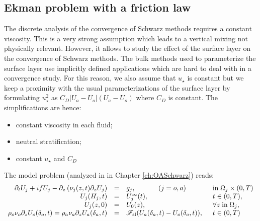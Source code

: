 \subsection{Ekman problem with a friction law}
\label{sec:airseaSCM_hierarchy_Ekman}
The discrete analysis of the convergence of Schwarz methods
requires a constant viscosity. This is a very strong assumption
which leads to a vertical mixing not physically relevant.
However, it allows to study the effect of the surface layer on the
convergence of Schwarz methods.
The bulk methods used to parameterize the surface layer use
implicitly defined applications which are hard to deal with
in a convergence study. For this reason, we also assume
that $u_\star$ is constant but we keep a proximity with
the usual parameterizations of the surface layer
by formulating $u_\star^2$
as $C_D |U_a - U_o|(U_a-U_o)$ where $C_D$ is constant.
The simplifications are hence:
\begin{itemize}
	\item constant viscosity in each fluid;
	\item neutral stratification;
	\item constant $u_\star$ and $C_D$
\end{itemize}
The model problem (analyzed in in Chapter \ref{ch:OASchwarz}) reads:
\begin{equation}
\label{eq:cplProblem}
\begin{array}{rcll}
\partial_t U_j + i f U_j - \partial_z \left( \nu_j(z,t) \partial_z U_j \right) &=& g_j,
~~~~~~~~~~ (j=o,a)
& \mbox{in}\;\Omega_j \times (0,T)\\
U_j(H_j,t) &=& U_j^\infty(t),  & t \in (0,T), \\ 
U_j(z,0) &=& U_0(z), & \forall z \; \mbox{in}\; \Omega_j, \\
\rho_o \nu_o \partial_z U_o(\delta_o,t) = \rho_a \nu_a \partial_z U_a(\delta_a,t)
&=& {\cal F}_{\rm sl}( U_a(\delta_a,t)-U_o(\delta_o,t) ), \;\; & t \in (0,T)
\end{array}
\end{equation}
